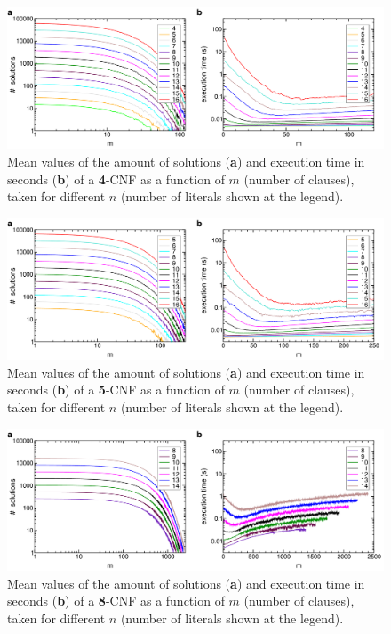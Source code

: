 \documentclass[12pt]{article}
\begin{document}
\begin{figure}[htbp]
  \begin{center}
    \includegraphics[width=15.2cm]{images/k4st.pdf}
    \caption{\small{Mean values of the amount of solutions ({\bf a}) and execution time in seconds ({\bf b}) of a {\bf 4}-CNF as a function of $m$ (number of clauses), taken for different $n$ (number of literals shown at the legend).}}
  \end{center}
\end{figure}

\begin{figure}[htbp]
  \begin{center}
    \includegraphics[width=15.2cm]{images/k5st.pdf}
    \caption{\small{Mean values of the amount of solutions ({\bf a}) and execution time in seconds ({\bf b}) of a {\bf 5}-CNF as a function of $m$ (number of clauses), taken for different $n$ (number of literals shown at the legend).}}
    \label{fig:k5}
  \end{center}
\end{figure}

\begin{figure}[htbp]
  \begin{center}
    \includegraphics[width=15.2cm]{images/k8st.pdf}
    \caption{\small{Mean values of the amount of solutions ({\bf a}) and execution time in seconds ({\bf b}) of a {\bf 8}-CNF as a function of $m$ (number of clauses), taken for different $n$ (number of literals shown at the legend).}}
    \label{fig:k8}
  \end{center}
\end{figure}
\end{document}
